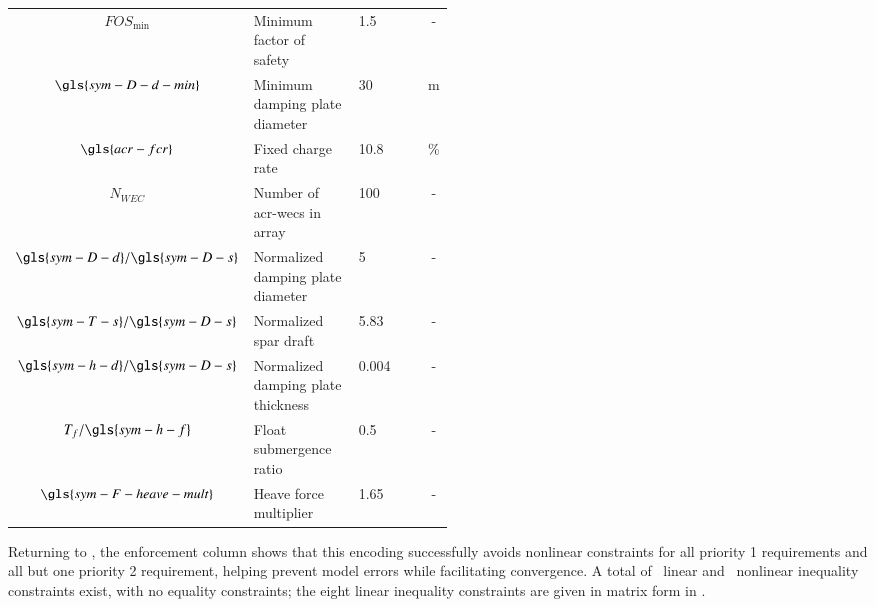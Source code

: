 \begin{table}[ht]
\begin{tabular}{cP{0.28\linewidth}P{0.23\linewidth}c}
$FOS_{\text{min}}$ & Minimum factor of safety& 1.5 & -  \\ 
$\gls{sym-D-d-min}$ & Minimum damping plate diameter & 30 & m  \\ 
$\gls{acr-fcr}$ & Fixed charge rate& 10.8 & \%  \\ 
$N_{WEC}$ & Number of \glspl{acr-wec} in array& 100 & -  \\ 
$\gls{sym-D-d}/{\gls{sym-D-s}}$ & Normalized damping plate diameter & 5 & -  \\ 
$\gls{sym-T-s}/{\gls{sym-D-s}}$ & Normalized spar draft& 5.83 & -  \\ 
$\gls{sym-h-d}/{\gls{sym-D-s}}$ & Normalized damping plate thickness & 0.004 & -  \\ 
$T_{f}/{\gls{sym-h-f}}$ & Float submergence ratio & 0.5 & -  \\ 
$\gls{sym-F-heave-mult}$ & Heave force multiplier & 1.65 & - \\ 
\end{tabular}
\end{table}

Returning to , the enforcement column shows that this encoding successfully avoids nonlinear constraints for all priority 1 requirements and all but one priority 2 requirement, helping prevent model errors while facilitating convergence.
A total of \resultsRE[numLinConstraints]~linear and \resultsRE[numNonlinConstraints]~nonlinear inequality constraints exist, with no equality constraints; the eight linear inequality constraints are given in matrix form in .

